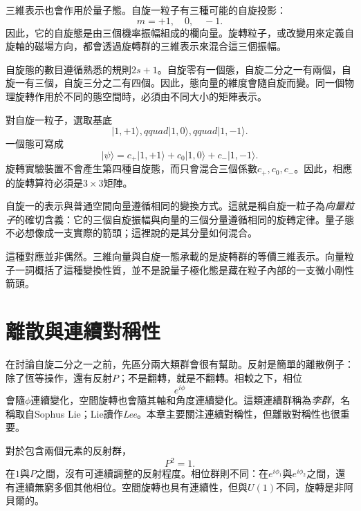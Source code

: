 三維表示也會作用於量子態。自旋一粒子有三種可能的自旋投影：
\begin{equation}
m=+1,\quad 0,\quad -1.
\end{equation}
因此，它的自旋態是由三個機率振幅組成的欄向量。旋轉粒子，或改變用來定義自旋軸的磁場方向，都會透過旋轉群的三維表示來混合這三個振幅。

自旋態的數目遵循熟悉的規則\(2s+1\)。自旋零有一個態，自旋二分之一有兩個，自旋一有三個，自旋三分之二有四個。因此，態向量的維度會隨自旋而變。同一個物理旋轉作用於不同的態空間時，必須由不同大小的矩陣表示。

對自旋一粒子，選取基底
\begin{equation}
\lvert 1,+1\rangle,qquad
\lvert 1,0\rangle,qquad
\lvert 1,-1\rangle.
\end{equation}
一個態可寫成
\begin{equation}
\lvert\psi\rangle
=c_{+}\lvert1,+1\rangle+c_0\lvert1,0\rangle+c_{-}\lvert1,-1\rangle.
\end{equation}
旋轉實驗裝置不會產生第四種自旋態，而只會混合三個係數\(c_+,c_0,c_-\)。因此，相應的旋轉算符必須是\(3\times3\)矩陣。

自旋一的表示與普通空間向量遵循相同的變換方式。這就是稱自旋一粒子為\emph{向量粒子}的確切含義：它的三個自旋振幅與向量的三個分量遵循相同的旋轉定律。量子態不必想像成一支實際的箭頭；這裡說的是其分量如何混合。

這種對應並非偶然。三維向量與自旋一態承載的是旋轉群的等價三維表示。{向量粒子}一詞概括了這種變換性質，並不是說量子極化態是藏在粒子內部的一支微小剛性箭頭。

\section{離散與連續對稱性}

在討論自旋二分之一之前，先區分兩大類群會很有幫助。反射是簡單的離散例子：除了恆等操作，還有反射\(P\)；不是翻轉，就是不翻轉。相較之下，相位
\begin{equation}
e^{i\phi}
\end{equation}
會隨\(\phi\)連續變化，空間旋轉也會隨其軸和角度連續變化。這類連續群稱為\emph{李群}，名稱取自Sophus Lie；Lie讀作\emph{Lee}。本章主要關注連續對稱性，但離散對稱性也很重要。

對於包含兩個元素的反射群，
\begin{equation}
P^2=1.
\end{equation}
在\(1\)與\(P\)之間，沒有可連續調整的反射程度。相位群則不同：在\(e^{i\phi_1}\)與\(e^{i\phi_2}\)之間，還有連續無窮多個其他相位。空間旋轉也具有連續性，但與\(U(1)\)不同，旋轉是非阿貝爾的。

